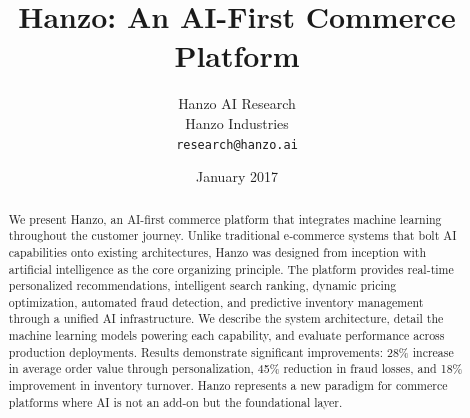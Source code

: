\documentclass[11pt,twocolumn]{article}
\title{Hanzo: An AI-First Commerce Platform}
\author{Hanzo AI Research\\
Hanzo Industries\\
\texttt{research@hanzo.ai}}
\date{January 2017}
\begin{document}
\hanzocoverpage

\begin{abstract}
We present Hanzo, an AI-first commerce platform that integrates machine learning throughout the customer journey. Unlike traditional e-commerce systems that bolt AI capabilities onto existing architectures, Hanzo was designed from inception with artificial intelligence as the core organizing principle. The platform provides real-time personalized recommendations, intelligent search ranking, dynamic pricing optimization, automated fraud detection, and predictive inventory management through a unified AI infrastructure. We describe the system architecture, detail the machine learning models powering each capability, and evaluate performance across production deployments. Results demonstrate significant improvements: 28\% increase in average order value through personalization, 45\% reduction in fraud losses, and 18\% improvement in inventory turnover. Hanzo represents a new paradigm for commerce platforms where AI is not an add-on but the foundational layer.
\end{abstract}









\end{document}
